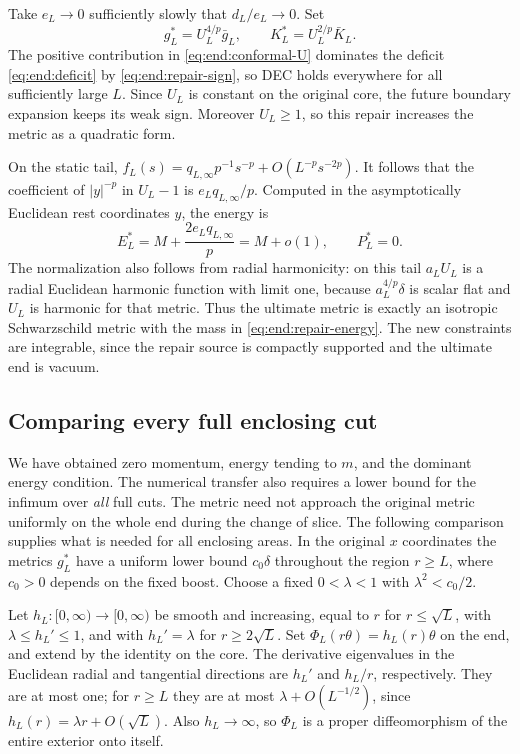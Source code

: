 Take $e_L\to0$ sufficiently slowly that $d_L/e_L\to0$.
Set
\[
 g_L^*=U_L^{4/p}\bar g_L,\qquad K_L^*=U_L^{2/p}\bar K_L.
\]
The positive contribution in \eqref{eq:end:conformal-U} dominates
the deficit \eqref{eq:end:deficit} by \eqref{eq:end:repair-sign},
so DEC holds everywhere for all sufficiently large $L$.  Since $U_L$
is constant on the original
core, the future boundary expansion keeps its weak sign.
Moreover $U_L\ge1$, so this repair increases the metric as a
quadratic form.

On the static tail, $f_L(s)=q_{L,\infty}p^{-1}s^{-p}
+O(L^{-p}s^{-2p})$.  It follows that the coefficient of $|y|^{-p}$
in $U_L-1$ is $e_Lq_{L,\infty}/p$.  Computed in the
asymptotically Euclidean rest coordinates $y$, the energy is
\begin{equation}\label{eq:end:repair-energy}
 E_L^*=M+\frac{2e_Lq_{L,\infty}}p=M+o(1),\qquad P_L^*=0.
\end{equation}
The normalization also follows from radial harmonicity: on this tail
$a_LU_L$ is a radial Euclidean harmonic function
with limit one, because $a_L^{4/p}\delta$ is scalar flat and
$U_L$ is harmonic for that metric.  Thus the ultimate metric
is exactly an isotropic Schwarzschild metric with the mass in
\eqref{eq:end:repair-energy}.  The new constraints
are integrable, since the repair source is compactly supported
and the ultimate end is vacuum.

\subsection{Comparing every full enclosing cut}

We have obtained zero momentum, energy tending to $m$, and the
dominant energy condition.  The numerical transfer also requires a
lower bound for the infimum over \emph{all} full cuts.  The metric
need not approach the original metric uniformly on
the whole end during the change of slice.  The following
comparison supplies what is needed for all enclosing areas.
In the original $x$ coordinates the metrics $g_L^*$ have a
uniform lower bound $c_0\delta$ throughout the region $r\ge L$,
where $c_0>0$ depends on the fixed boost.  Choose a fixed
$0<\lambda<1$ with $\lambda^2<c_0/2$.

Let $h_L:[0,\infty)\to[0,\infty)$ be smooth and increasing,
equal to $r$ for $r\le\sqrt L$, with $\lambda\le h_L'\le1$,
and with $h_L'=\lambda$ for $r\ge2\sqrt L$.
Set $\Phi_L(r\theta)=h_L(r)\theta$ on the end, and extend by
the identity on the core.  The derivative eigenvalues in the
Euclidean radial and tangential directions are $h_L'$ and
$h_L/r$, respectively.  They are at most one; for $r\ge L$
they are at most $\lambda+O(L^{-1/2})$, since
$h_L(r)=\lambda r+O(\sqrt L)$.  Also $h_L\to\infty$, so
$\Phi_L$ is a proper diffeomorphism of the entire exterior
onto itself.

